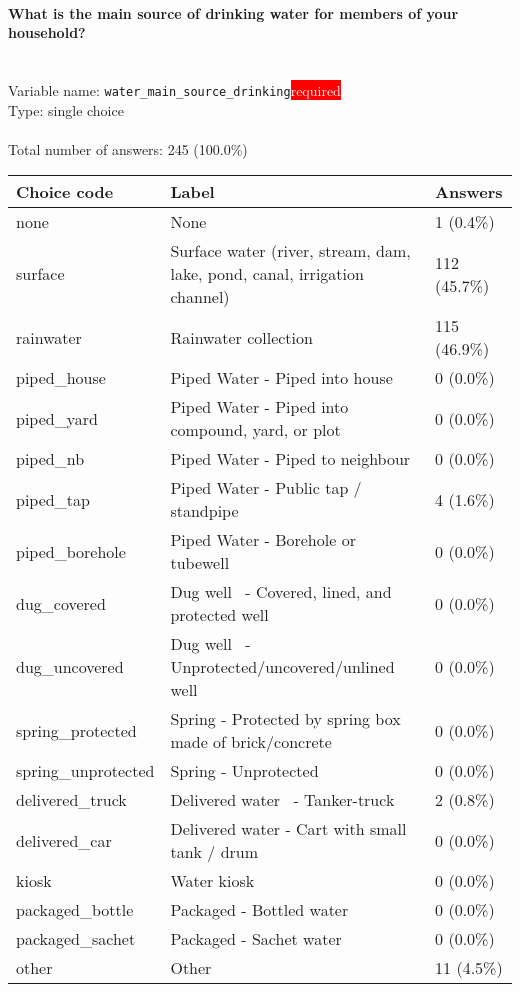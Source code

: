 \documentclass[11.5pt, a4paper]{scrartcl}
\begin{document}
\paragraph{What is the main source of drinking water for members of your household? }
\  \\Variable name: \texttt{water\_main\_source\_drinking}\hfill\colorbox{red}{\small{\textcolor{white}{required}}}\\
 Type: single choice\\
\\Total number of answers: 245 (100.0\%)
\\[0.2em] \begin{tabular}{p{4cm}|p{8cm}|p{3cm}}
Choice code & Label & Answers \\
\hline
none & None& \cellcolor{color0}1 (0.4\%)\\
\cellcolor{mygray} surface & \cellcolor{mygray}Surface water (river, stream, dam, lake, pond, canal, irrigation channel) & \cellcolor{color2}112 (45.7\%)\\
rainwater & Rainwater collection & \cellcolor{color2}115 (46.9\%)\\
\cellcolor{mygray} piped\_house & \cellcolor{mygray}Piped Water - Piped into house & \cellcolor{color0}0 (0.0\%)\\
piped\_yard & Piped Water - Piped into compound, yard, or plot& \cellcolor{color0}0 (0.0\%)\\
\cellcolor{mygray} piped\_nb & \cellcolor{mygray}Piped Water - Piped to neighbour  & \cellcolor{color0}0 (0.0\%)\\
piped\_tap & Piped Water - Public tap / standpipe & \cellcolor{color0}4 (1.6\%)\\
\cellcolor{mygray} piped\_borehole & \cellcolor{mygray}Piped Water - Borehole or tubewell  & \cellcolor{color0}0 (0.0\%)\\
dug\_covered & Dug well  - Covered, lined, and protected well & \cellcolor{color0}0 (0.0\%)\\
\cellcolor{mygray} dug\_uncovered & \cellcolor{mygray}Dug well  - Unprotected/uncovered/unlined well  & \cellcolor{color0}0 (0.0\%)\\
spring\_protected & Spring - Protected by spring box made of brick/concrete& \cellcolor{color0}0 (0.0\%)\\
\cellcolor{mygray} spring\_unprotected & \cellcolor{mygray}Spring - Unprotected  & \cellcolor{color0}0 (0.0\%)\\
delivered\_truck & Delivered water  - Tanker-truck & \cellcolor{color0}2 (0.8\%)\\
\cellcolor{mygray} delivered\_car & \cellcolor{mygray}Delivered water - Cart with small tank / drum & \cellcolor{color0}0 (0.0\%)\\
kiosk & Water kiosk& \cellcolor{color0}0 (0.0\%)\\
\cellcolor{mygray} packaged\_bottle & \cellcolor{mygray}Packaged - Bottled water & \cellcolor{color0}0 (0.0\%)\\
packaged\_sachet & Packaged - Sachet water & \cellcolor{color0}0 (0.0\%)\\
\cellcolor{mygray} other & \cellcolor{mygray}Other  & \cellcolor{color0}11 (4.5\%)\\
\end{tabular}
\end{document}
